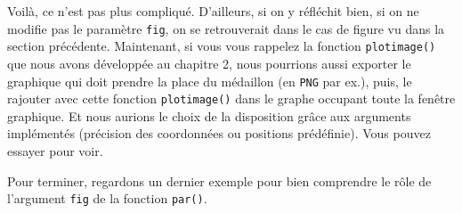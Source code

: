 \documentclass[]{article}
\begin{document}
Voilà, ce n'est pas plus compliqué. D'ailleurs, si on y réfléchit bien, si on ne
modifie pas le paramètre \texttt{fig}, on se retrouverait dans le cas de figure vu dans
la section précédente. Maintenant, si vous vous rappelez la fonction
\texttt{plotimage()} que nous avons développée au chapitre 2, nous pourrions aussi
exporter le graphique qui doit prendre la place du médaillon (en \texttt{PNG} par ex.),
puis, le rajouter avec cette fonction \texttt{plotimage()} dans le graphe occupant
toute la fenêtre graphique. Et nous aurions le choix de la disposition grâce aux
arguments implémentés (précision des coordonnées ou positions prédéfinie). Vous
pouvez essayer pour voir.

Pour terminer, regardons un dernier exemple pour bien comprendre le rôle de l'argument \texttt{fig} de la fonction \texttt{par()}.
\end{document}
